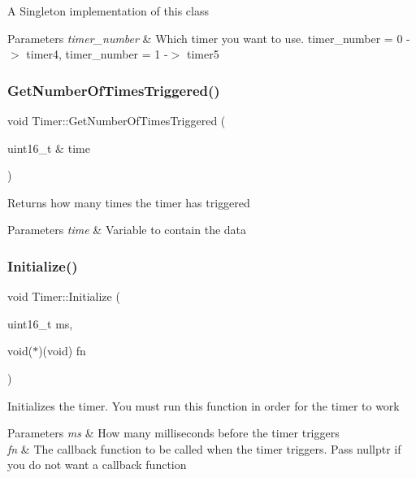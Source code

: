 A Singleton implementation of this class 
\begin{DoxyParams}{Parameters}
{\em timer\+\_\+number} & Which timer you want to use. timer\+\_\+number = 0 -\/$>$ timer4, timer\+\_\+number = 1 -\/$>$ timer5 \\
\hline
\end{DoxyParams}
\hypertarget{class_timer_a4f536c9539a977acc3e262f8767694fa}{}\label{class_timer_a4f536c9539a977acc3e262f8767694fa} 
\subsubsection{\texorpdfstring{Get\+Number\+Of\+Times\+Triggered()}{GetNumberOfTimesTriggered()}}
{\footnotesize\ttfamily void Timer\+::\+Get\+Number\+Of\+Times\+Triggered (\begin{DoxyParamCaption}\item[{uint16\+\_\+t \&}]{time }\end{DoxyParamCaption})}

Returns how many times the timer has triggered 
\begin{DoxyParams}{Parameters}
{\em time} & Variable to contain the data \\
\hline
\end{DoxyParams}
\hypertarget{class_timer_a04ed0eb1468656c271645c2165bbe147}{}\label{class_timer_a04ed0eb1468656c271645c2165bbe147} 
\subsubsection{\texorpdfstring{Initialize()}{Initialize()}}
{\footnotesize\ttfamily void Timer\+::\+Initialize (\begin{DoxyParamCaption}\item[{uint16\+\_\+t}]{ms,  }\item[{void($\ast$)(void)}]{fn }\end{DoxyParamCaption})}

Initializes the timer. You must run this function in order for the timer to work 
\begin{DoxyParams}{Parameters}
{\em ms} & How many milliseconds before the timer triggers \\
\hline
{\em fn} & The callback function to be called when the timer triggers. Pass nullptr if you do not want a callback function \\
\hline
\end{DoxyParams}
\hypertarget{class_timer_a4e607b129b392c11adddd9641a320436}{}\label{class_timer_a4e607b129b392c11adddd9641a320436} 
